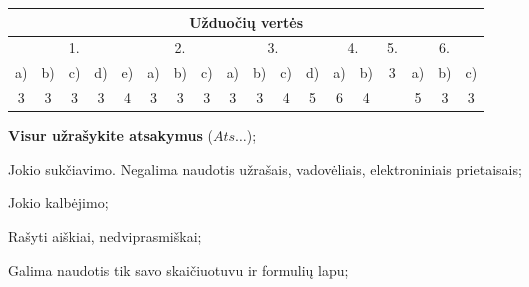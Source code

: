 \documentclass[a4paper]{article}
\begin{document}
\begin{table}[!htpb]
      \centering
      \begin{tabular}{|cccccccccccccccccc|}
            \hline
            \multicolumn{18}{|c|}{Užduočių vertės}
            \\
            \hline
            \multicolumn{5}{|c|}{1.}
                                                    &
            \multicolumn{3}{c|}{2.}                 &
            \multicolumn{4}{c|}{3.}
                                                    & \multicolumn{2}{c|}{4.} &
            \multicolumn{1}{c|}{5.}                 & \multicolumn{3}{c|}{6.}
            \\ \hline
            \multicolumn{1}{|c|}{a)}                & \multicolumn{1}{c|}{b)} &
            \multicolumn{1}{c|}{c)}                 & \multicolumn{1}{c|}{d)} &
            \multicolumn{1}{c|}{e)}                 &
            \multicolumn{1}{c|}{a)}                 & \multicolumn{1}{c|}{b)} &
            \multicolumn{1}{c|}{c)}                 &
            \multicolumn{1}{c|}{a)}                 & \multicolumn{1}{c|}{b)} &
            \multicolumn{1}{c|}{c)}                 &
            \multicolumn{1}{c|}{d)}                 & \multicolumn{1}{c|}{a)} &
            \multicolumn{1}{c|}{b)}                 &
            \multicolumn{1}{c|}{\multirow{2}{*}{3}} & \multicolumn{1}{c|}{a)} &
            \multicolumn{1}{c|}{b)}                 & c)
            \\
            \multicolumn{1}{|c|}{3}                 & \multicolumn{1}{c|}{3}  &
            \multicolumn{1}{c|}{3}                  & \multicolumn{1}{c|}{3}  &
            \multicolumn{1}{c|}{4}                  &
            \multicolumn{1}{c|}{3}                  & \multicolumn{1}{c|}{3}  &
            \multicolumn{1}{c|}{3}                  &
            \multicolumn{1}{c|}{3}                  & \multicolumn{1}{c|}{3}  &
            \multicolumn{1}{c|}{4}                  &
            \multicolumn{1}{c|}{5}                  & \multicolumn{1}{c|}{6}  &
            \multicolumn{1}{c|}{4}                  &
            \multicolumn{1}{c|}{}                   & \multicolumn{1}{c|}{5}  &
            \multicolumn{1}{c|}{3}                  & 3
            \\ \hline
      \end{tabular}
\end{table}

\begin{small}
      \begin{enumerate*}[label={(\arabic*)}]
            \item \textbf{Visur užrašykite atsakymus} ($Ats\ldots$);
            \item Jokio sukčiavimo. Negalima naudotis užrašais, vadovėliais,
            elektroniniais prietaisais;
            \item Jokio kalbėjimo;
            \item Rašyti aiškiai, nedviprasmiškai;
            \item Galima naudotis tik savo skaičiuotuvu ir formulių lapu;
      \end{enumerate*}
\end{small}
\end{document}
